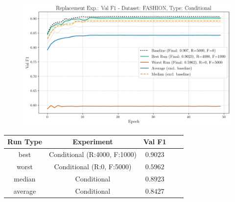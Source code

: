 \begin{figure}[htbp]
	\centering
	\includegraphics[width=.85\textwidth]{abb/strat_classifier_performance/FASHION_STRATIFIED_CLASSIFIERS_COND_GAN/replacement_experiments/val_f1_score_['COND']_FASHION_all.png}
	\label{fig:app_strat_class_performance_replacement_exp._val_f1_score_}
\end{figure}
\begin{table}[H]
	\centering
	\vspace{-1em}
	\begin{tabular}{|c|c|c|c|c|}
		\hline
		Run Type & Experiment & Val F1 \\ \hline
		best & Conditional (R:4000, F:1000) & $0.9023$\\ \hline
		worst & Conditional (R:0, F:5000) & $0.5962$\\ \hline
		median & Conditional & $0.8923$\\ \hline
		average & Conditional & $0.8427$
		\\ \hline
	\end{tabular}
\end{table}
\newpage

